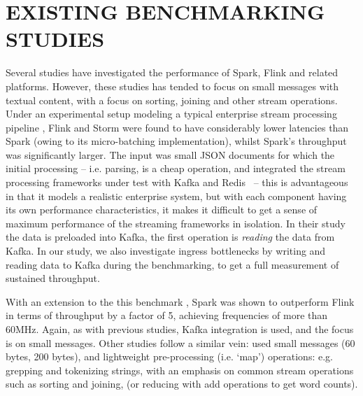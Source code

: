 \documentclass[conference]{IEEEtran}
\begin{document}
\section{EXISTING BENCHMARKING STUDIES}\label{benchmarking}
Several studies have investigated the performance of Spark, Flink and related platforms. However, these studies has tended to focus on small messages with textual content, with a focus on sorting, joining and other stream operations. Under an experimental setup modeling a typical enterprise stream processing pipeline \cite{chintapalliBenchmarkingStreamingComputation2016}, Flink and Storm were found to have considerably lower latencies than Spark (owing to its micro-batching implementation), whilst Spark’s throughput was significantly larger. The input was small JSON documents for which the initial processing -- i.e. parsing, is a cheap operation, and integrated the stream processing frameworks under test with Kafka and Redis~\cite{salvatoresanfilippoRedis2009} -- this is advantageous in that it models a realistic enterprise system, but with each component having its own performance characteristics, it makes it difficult to get a sense of maximum performance of the streaming frameworks in isolation. In their study the data is preloaded into Kafka, the first operation is \emph{reading} the data from Kafka. In our study, we also investigate ingress bottlenecks by writing and reading data to Kafka during the benchmarking, to get a full measurement of sustained throughput.

With an extension to the this benchmark \cite{grierExtendingYahooStreaming2016}, Spark was shown to outperform Flink in terms of throughput by a factor of 5, achieving frequencies of more than 60MHz. Again, as with previous studies, Kafka integration is used, and the focus is on small messages.
Other studies follow a similar vein: \cite{qianBenchmarkingModernDistributed2016} used small messages (60 bytes, 200 bytes), and lightweight pre-processing (i.e. `map') operations: e.g. grepping and tokenizing strings, with an emphasis on common stream operations such as sorting and joining, (or reducing with add operations to get word counts).
\end{document}

